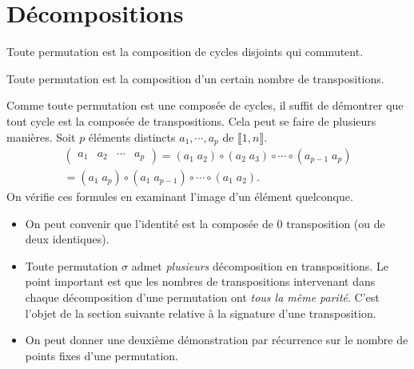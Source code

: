 \section{Décompositions}
\begin{propn} \label{prop:decompcycl}
 Toute permutation est la composition de cycles disjoints qui commutent.
\end{propn}
\begin{propn}\label{prop:decomptranspo}
 Toute permutation est la composition d'un certain nombre de transpositions.
\end{propn}
\begin{demo}
 Comme toute permutation est une composée de cycles, il suffit de démontrer que tout cycle est la composée de transpositions. Cela peut se faire de plusieurs manières.\newline
Soit $p$ éléments distincts $a_1,\cdots,a_p$ de $\llbracket 1, n\rrbracket$.
\begin{multline*}
 \begin{pmatrix}
  a_1 & a_2 & \cdots & a_p
 \end{pmatrix}
 = (a_1\; a_2)\circ (a_2\; a_3)\circ \cdots \circ (a_{p-1}\; a_p) \\
 = (a_1\;a_p)\circ(a_1\;a_{p-1})\circ\cdots\circ (a_1\;a_2).
\end{multline*}
On vérifie ces formules en examinant l'image d'un élément quelconque.
\end{demo}

\begin{rems}
 \begin{itemize}
\item On peut convenir que l'identité est la composée de $0$ transposition (ou de deux identiques).
\item Toute permutation $\sigma$ admet \emph{plusieurs} décomposition en transpositions. Le point important est que les nombres de transpositions intervenant dans chaque décomposition d'une permutation ont \emph{tous la même parité}. C'est l'objet de la section suivante relative à la signature d'une transposition.
\item On peut donner une deuxième démonstration par récurrence sur le nombre de points fixes d'une permutation.
 \end{itemize}
\end{rems}
\clearpage
